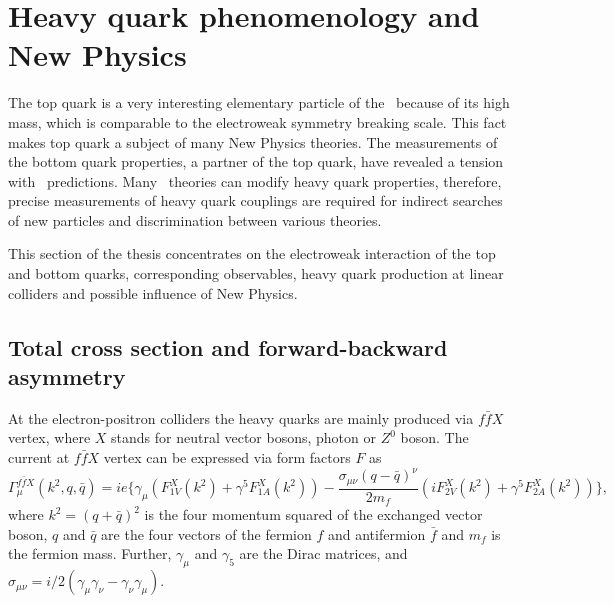 \section{Heavy quark phenomenology and New Physics}
The top quark is a very interesting elementary particle of the \sm\ because of its high mass, which is comparable to the electroweak symmetry breaking scale. 
This fact makes top quark a subject of many New Physics theories. 
The measurements of the bottom quark properties, a partner of the top quark, have revealed a tension with \sm\ predictions. 
Many \bsm\ theories can modify heavy quark properties, therefore, precise measurements of heavy quark couplings are required for indirect searches of new particles and discrimination between various theories. 

This section of the thesis concentrates on the electroweak interaction of the top and bottom quarks, corresponding observables, heavy quark production at linear colliders and possible influence of New Physics.
\subsection{Total cross section and forward-backward asymmetry}

At the electron-positron colliders the heavy quarks are mainly produced via $f\bar{f}X$ vertex, where $X$ stands for neutral vector bosons, photon or $Z^0$ boson.  The current at $f\bar{f}X$ vertex can be expressed via form factors $F$ as 
\begin{equation}
	\Gamma^{f\bar{f}X}_\mu (k^2,q,\bar{q}) = ie\{ \gamma_\mu (F^X_{1V}(k^2) + \gamma^5 F^X_{1A}(k^2)) - \frac{\sigma_{\mu\nu}(q-\bar{q})^\nu}{2m_f}(iF^X_{2V}(k^2) + \gamma^5 F^X_{2A}(k^2)) \},
\end{equation}
where $k^2= (q+\bar{q})^2$ is the four momentum squared of the exchanged vector boson, $q$ and $\bar{q}$ are the four vectors of the fermion $f$ and antifermion $\bar{f}$ and $m_f$ is the fermion mass. Further, $\gamma_\mu$ and $\gamma_5$ are the Dirac matrices, and $\sigma_{\mu\nu} = i/2(\gamma_\mu\gamma_\nu - \gamma_\nu\gamma_\mu)$.

